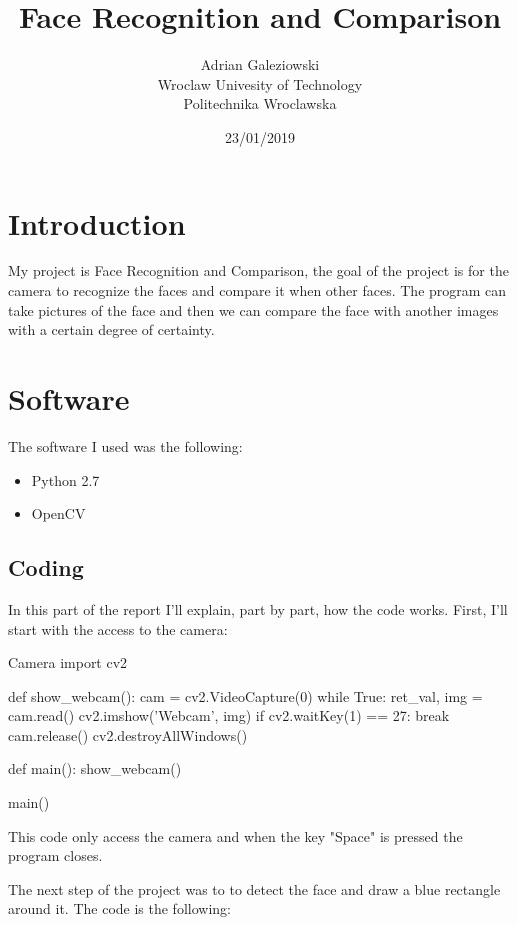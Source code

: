 \documentclass[12pt]{article}
\title{Face Recognition and Comparison}
\author{\makebox[.9\textwidth]{Rui Carapinha} \and Adrian Galeziowski\\Wroclaw Univesity of Technology\\Politechnika Wroclawska}
\date{23/01/2019}
\begin{document}
\pdfpageheight   29.7cm
\pdfpagewidth    21cm
 
\maketitle

\section{Introduction}

My project is Face Recognition and Comparison, the goal of the project is for the camera to recognize the faces and compare it when other faces. The program can take pictures of the face and then we can compare the face with another images with a certain degree of certainty.

\section{Software}

\noindent The software I used was the following:
\begin{itemize}
	\item Python 2.7
	\item OpenCV
\end{itemize}

\subsection{Coding}
In this part of the report I'll explain, part by part, how the code works. First, I'll start with the access to the camera:

\begin{codelisting}{Camera}
import cv2

def show_webcam():
	cam = cv2.VideoCapture(0)
	while True:
		ret_val, img = cam.read()
		cv2.imshow('Webcam', img)
		if cv2.waitKey(1) == 27: 
			break
	cam.release()
	cv2.destroyAllWindows()

def main():
	show_webcam()

main()
\end{codelisting}

This code only access the camera and when the key "Space" is pressed the program closes.

The next step of the project was to to detect the face and draw a blue rectangle around it. The code is the following:
\end{document}
